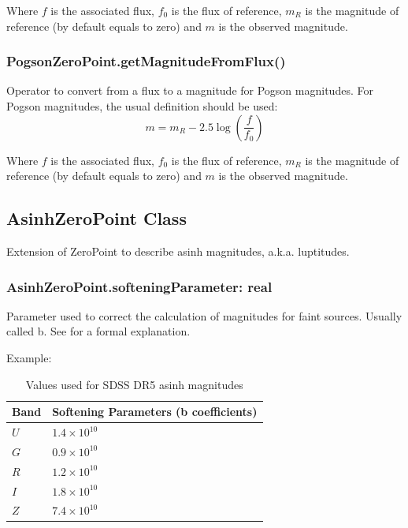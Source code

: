 \documentclass[11pt,a4paper]{ivoa}
\begin{document}
Where $f$ is the associated flux, $f_0$ is the flux of reference, $m_R$ is
the magnitude of reference (by default equals to zero) and $m$ is the
observed magnitude.
\par

\subsubsection{PogsonZeroPoint.getMagnitudeFromFlux()}
Operator to convert from a flux to a magnitude for Pogson magnitudes.
For Pogson magnitudes, the usual definition should be used:
\begin{equation} \label{eq:26}
m = m_R - 2.5\log(\frac{f}{f_0 })
\end{equation}

Where $f$ is the associated flux, $f_0$ is the flux of reference,
$m_R$ is the magnitude of reference (by default equals to zero) and
$m$ is the observed magnitude.
\par

\subsection{AsinhZeroPoint Class}
Extension of ZeroPoint  to describe asinh magnitudes, a.k.a. luptitudes.
\par

\subsubsection{AsinhZeroPoint.softeningParameter: real}
Parameter used to correct the calculation of magnitudes for faint
sources. Usually called b. See \citep{1999AJ....118.1406L} for
a formal explanation.
\par

Example:
\par


\begin{table}[ht]
\centering
    \begin{tabular}{|m{2.7cm}|m{8cm}|}
	\hline %
Band & Softening Parameters (b coefficients) \\
\hline
 $U$ & $1.4 \times 10^{10}$ \\
 $G$ & $0.9 \times 10^{10}$ \\
 $R$ & $1.2 \times 10^{10}$ \\
 $I$ & $1.8 \times 10^{10}$ \\
 $Z$ & $7.4 \times 10^{10}$ \\
\hline
\end{tabular}
\caption{Values used for SDSS DR5 asinh magnitudes}

\end{table}
\end{document}
